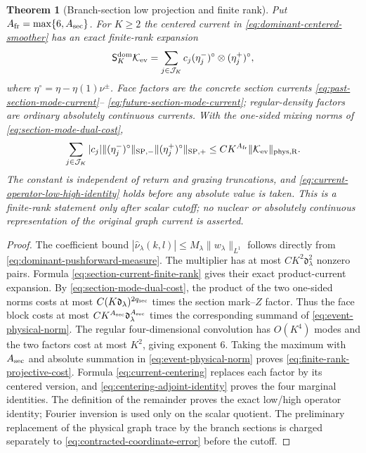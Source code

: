 \documentclass[11pt]{article}
\newtheorem{theorem}{Theorem}[section]
\begin{document}
\begin{theorem}[Branch-section low projection and finite rank]
\label{thm:canonical-dominant-smoothing}
Put $A_{\rm fr}=\max\{6,A_{\rm sec}\}$.  For $K\ge2$ the centered current in
\eqref{eq:dominant-centered-smoother} has an exact finite-rank expansion
\begin{equation}
\label{eq:finite-rank-low-kernel}
 \mathsf S_K^{\rm dom}\mathcal K_{\rm ev}
 =\sum_{j\in\mathcal J_K}c_j
       (\eta_j^-)^\circ\otimes(\eta_j^+)^\circ,
\end{equation}
where $\eta^\circ=\eta-\eta(1)\nu^\pm$.  Face factors are the concrete
section currents \eqref{eq:past-section-mode-current}--
\eqref{eq:future-section-mode-current}; regular-density factors are ordinary
absolutely continuous currents.  With the one-sided mixing norms of
\eqref{eq:section-mode-dual-cost},
\begin{equation}
\label{eq:finite-rank-projective-cost}
 \sum_{j\in\mathcal J_K}|c_j|
 \|(\eta_j^-)^\circ\|_{\rm SP,-}
 \|(\eta_j^+)^\circ\|_{\rm SP,+}
 \le CK^{A_{\rm fr}}\|\mathcal K_{\rm ev}\|_{\rm phys,R}.
\end{equation}
The constant is independent of return and grazing truncations, and
\eqref{eq:current-operator-low-high-identity} holds before any absolute value
is taken.  This is a finite-rank statement only after scalar cutoff; no
nuclear or absolutely continuous representation of the original graph current
is asserted.
\end{theorem}

\begin{proof}
The coefficient bound
$|\widehat\nu_\lambda(k,l)|\le
M_\lambda\|w_\lambda\|_{L^1}$ follows directly from
\eqref{eq:dominant-pushforward-measure}.  The multiplier has at most
$CK^2\mathfrak d_\lambda^2$ nonzero pairs.  Formula
\eqref{eq:section-current-finite-rank} gives their exact product-current
expansion.  By \eqref{eq:section-mode-dual-cost}, the product of the two
one-sided norms costs at most
$C(K\mathfrak d_\lambda)^{2q_{\rm sec}}$ times the section mark--$Z$ factor.
Thus the face block costs at most
$CK^{A_{\rm sec}}\mathfrak d_\lambda^{A_{\rm sec}}$ times the corresponding
summand of \eqref{eq:event-physical-norm}.  The regular
four-dimensional convolution has $O(K^4)$ modes and the two factors cost at
most $K^2$, giving exponent $6$.  Taking the maximum with $A_{\rm sec}$ and
absolute
summation in \eqref{eq:event-physical-norm} proves
\eqref{eq:finite-rank-projective-cost}.  Formula
\eqref{eq:current-centering} replaces each factor by its centered version,
and \eqref{eq:centering-adjoint-identity} proves the four marginal identities.
The definition of the remainder proves the exact low/high operator identity;
Fourier inversion is used only on the scalar quotient.  The preliminary
replacement of the physical graph trace by the branch sections is charged
separately to \eqref{eq:contracted-coordinate-error} before the cutoff.
\end{proof}
\end{document}
